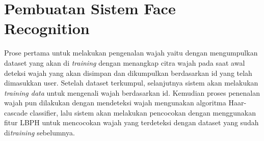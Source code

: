 \newpage
\section{Pembuatan Sistem Face Recognition}
Prose pertama untuk melakukan pengenalan wajah yaitu dengan mengumpulkan dataset yang akan di \emph{training} dengan menangkap citra wajah pada saat awal deteksi wajah yang akan 
disimpan dan dikumpulkan berdasarkan id yang telah dimasukkan user. Setelah dataset terkumpul, selanjutnya sistem akan melakukan \emph{training data} untuk mengenali wajah berdasarkan id. 
Kemudian proses penenalan wajah pun dilakukan dengan mendeteksi wajah mengunakan algoritma Haar-cascade classifier, lalu sistem akan melakukan pencocokan dengan menggunakan fitur LBPH 
untuk mencocokan wajah yang terdeteksi dengan dataset yang sudah di\emph{training} sebelumnya.




